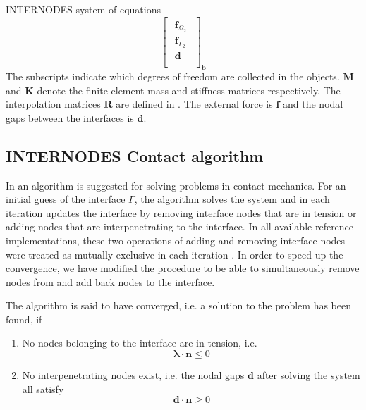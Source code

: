 \documentclass[11pt, a4paper]{article}
\begin{document}
\begin{block}{INTERNODES system of equations}
\begin{equation}
{\begin{bmatrix}
\begin{array}{c}
    \mathbf{f}_{\Omega_2} \\
    \mathbf{f}_{\Gamma_2} \\ \hline
    \mathbf{d} \\
\end{array}
\end{bmatrix}
}_{\mathbf{b}}
\label{equ:linear-system}
\end{equation}
The subscripts indicate which degrees of freedom are collected in the objects. $\mathbf{M}$ and $\mathbf{K}$ denote the finite element mass and stiffness matrices respectively. The interpolation matrices $\mathbf{R}$ are defined in . The external force is $\mathbf{f}$ and the nodal gaps between the interfaces is $\mathbf{d}$.
\end{block}

\subsection{INTERNODES Contact algorithm}
\label{subsec:contact-algorithm}

In \cite{voet} an algorithm is suggested for solving problems in contact
mechanics. For an initial guess of the interface $\Gamma$, the algorithm solves 
the system  and in each iteration updates the interface
by removing interface nodes that are in tension or adding nodes that are
interpenetrating to the interface. In all available reference implementations, these two operations of adding and removing interface nodes were treated as mutually exclusive in each iteration \cite{voetthesis, voet, moritz}. In order to speed up the convergence, we have modified the procedure to be able to simultaneously remove nodes from and add back nodes to the interface.

The algorithm is said to have converged, i.e. a solution to the problem has been found, if

\begin{enumerate}
    \item No nodes belonging to the interface are in tension, i.e.
        \begin{equation} \label{equ:convcheck1}
            \boldsymbol{\lambda} \cdot \mathbf{n} \leq 0
        \end{equation}
    \item No interpenetrating nodes exist, i.e. the nodal gaps $\mathbf{d}$ after solving the system all satisfy
        \begin{equation} \label{equ:convcheck2}
            \mathbf{d} \cdot \mathbf{n} \geq 0
        \end{equation}
\end{enumerate}
\end{document}
